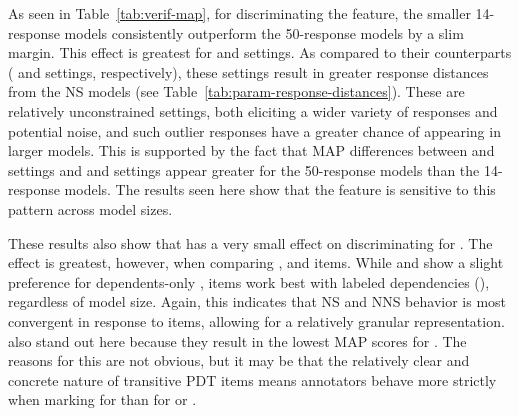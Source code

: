 As seen in Table~\ref{tab:verif-map}, for discriminating the  feature, the smaller 14-response models consistently outperform the 50-response models by a slim margin. This effect is greatest for  and  settings. As compared to their counterparts ( and  settings, respectively), these settings result in greater response distances from the NS models (see Table~\ref{tab:param-response-distances}). These are relatively unconstrained settings, both eliciting a wider variety of responses and potential noise, and such outlier responses have a greater chance of appearing in larger models. This is supported by the fact that MAP differences between  and  settings and  and  settings appear greater for the 50-response models than the 14-response models. The results seen here show that the  feature is sensitive to this pattern across model sizes. 

These results also show that  has a very small effect on discriminating for . The effect is greatest, however, when comparing ,  and  items. While  and  show a slight preference for dependents-only ,  items work best with labeled dependencies (), regardless of model size. Again, this indicates that NS and NNS behavior is most convergent in response to  items, allowing for a relatively granular representation.  also stand out here because they result in the lowest MAP scores for . The reasons for this are not obvious, but it may be that the relatively clear and concrete nature of transitive PDT items means annotators behave more strictly when marking  for  than for  or .


